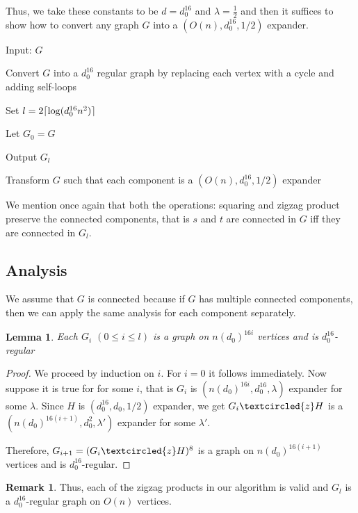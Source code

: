 \documentclass[10pt]{article}
\theoremstyle{plain}
\newtheorem{lemma}[theorem]{Lemma}
\theoremstyle{definition}
\newtheorem*{remark}{Remark}
\DeclarePairedDelimiter\ceil{\lceil}{\rceil}
\begin{document}
Thus, we take these constants to be $d = d_0^{16}$ and $\lambda = \frac12$ and then it suffices to show how to convert any graph $G$ into a $(O(n),d_0^{16},1/2)$ expander.

\medskip

\begin{algorithm}[H]
\SetAlgoLined
 Input: $G$
 
 Convert $G$ into a $d_0^{16}$ regular graph by replacing each vertex with a cycle and adding self-loops
 
 Set $l = 2\ceil{\log (d_0^{16}n^2)}$
 
 Let $G_0 = G$
 
 
 Output $G_l$
 \caption{Transform $G$ such that each component is a $(O(n),d_0^{16}, 1/2)$ expander}
\end{algorithm}

\medskip

We mention once again that both the operations: squaring and zigzag product preserve the connected components, that is $s$ and $t$ are connected in $G$ iff they are connected in $G_l$.

\subsection{Analysis}

We assume that $G$ is connected because if $G$ has multiple connected components, then we can apply the same analysis for each component separately.

\begin{lemma}
Each $G_i$ $(0 \leq i \leq l)$ is a graph on $n(d_0)^{16i}$ vertices and is $d_0^{16}$-regular
\end{lemma}

\begin{proof}
We proceed by induction on $i$. For $i=0$ it follows immediately. Now suppose it is true for for some $i$, that is $G_i$ is $(n(d_0)^{16i}, d_0^{16}, \lambda)$ expander for some $\lambda$. Since $H$ is $(d_0^{16}, d_0, 1/2)$ expander, we get $G_i \textcircled{z} H$ is a $(n(d_0)^{16(i+1)}, d_0^{2}, \lambda')$ expander for some $\lambda'$. 

Therefore, $G_{i+1} = (G_i \textcircled{z} H)^8$ is a graph on $n(d_0)^{16(i+1)}$ vertices and is $d_0^{16}$-regular.
\end{proof}

\begin{remark}
Thus, each of the zigzag products in our algorithm is valid and $G_l$ is a $d_0^{16}$-regular graph on $O(n)$ vertices.
\end{remark}
\end{document}
